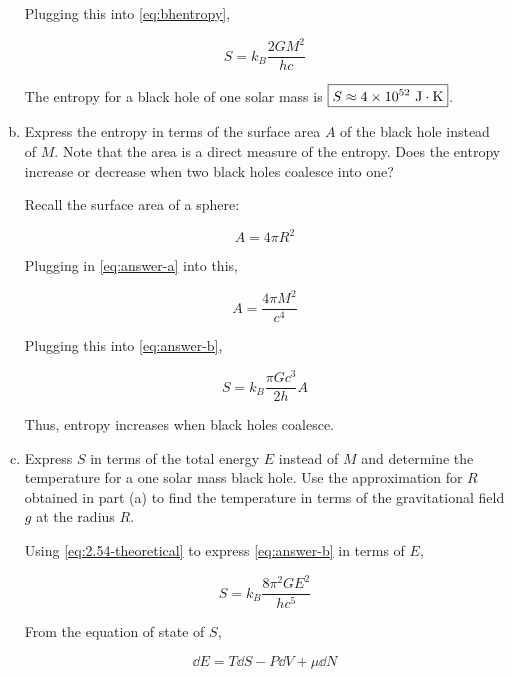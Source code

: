\documentclass[9pt,a4paper,twocolumn]{article}
\begin{document}
\begin{enumerate}[(a)]
Plugging this into \eqref{eq:bhentropy},

\begin{equation}\label{eq:answer-b}
	\boxed{
		S = k_B \frac{2GM^2}{hc}
	}
\end{equation}

The entropy for a black hole of one solar mass is $\boxed{S \approx 4 \times 10^{52}$  $\mathrm{J\cdot K}}$.

\item Express the entropy in terms of the surface area $A$ of the black hole instead of $M$. Note that the area is a direct measure of the entropy. Does the entropy increase or decrease when two black holes coalesce into one?

Recall the surface area of a sphere:

\begin{equation}\label{eq:spherearea}
	A = 4\pi R^2
\end{equation}

Plugging in \eqref{eq:answer-a} into this,

\begin{equation}
	A = \frac{4\pi M^2}{c^4}
\end{equation}

Plugging this into \eqref{eq:answer-b},

\begin{equation}
	\boxed{
		S = k_B \frac{\pi Gc^3}{2h}A
	}
\end{equation}

Thus, entropy increases when black holes coalesce.

\item Express $S$ in terms of the total energy $E$ instead of $M$ and determine the temperature for a one solar mass black hole. Use the approximation for $R$ obtained in part (a) to find the temperature in terms of the gravitational field $g$ at the radius $R$.

Using \eqref{eq:2.54-theoretical} to express \eqref{eq:answer-b} in terms of $E$,

\begin{equation}\label{eq:entropyinE}
	S = k_B \frac{8\pi^2 GE^2}{hc^5}
\end{equation}

From the equation of state of $S$,

\begin{equation}\label{eq:ftr}
	\dd{E} = T\dd{S} - P\dd{V} + \mu\dd{N}
\end{equation}


\end{enumerate}
\end{document}
